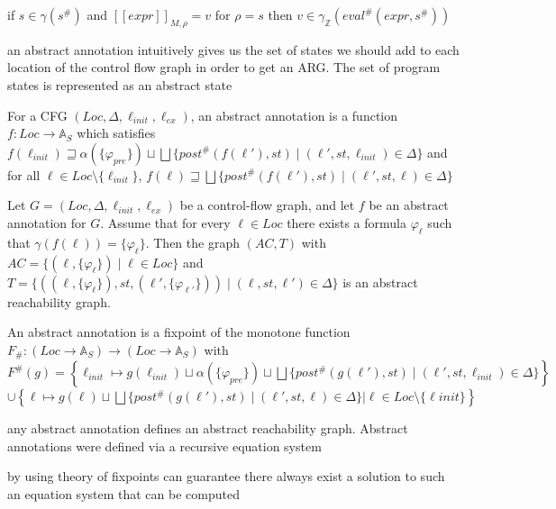 \documentclass[landscape, a4paper]{article}
\begin{document}
\begin{minipage}[t]{0.2\linewidth}
\begin{betterlist}
		\begin{betterlist}
			\item if $s \in \gamma(s^\#)$ and $[[expr]]_{M,\rho} = v$ for $\rho = s$ then $v \in \gamma_{\mathbb{Z}}(eval^\#(expr, s^\#))$
		\end{betterlist}\color{black}
		\item an abstract annotation intuitively gives us the set of states we should add to each location of the control flow graph in order to get an ARG. The set of program states is represented as an abstract state
		\item \color{orange}For a CFG $(Loc, \Delta, \ell_{init}, \ell_{ex})$, an \alert{abstract annotation} is a function $f: Loc \rightarrow \mathbb{A}_S$ which satisfies $f(\ell_{init}) \sqsupseteq \alpha(\{\varphi_{pre}\}) \sqcup \bigsqcup \{post^\#(f(\ell'), st) \mid (\ell′, st, \ell_{init}) \in \Delta\}$ and for all $\ell \in Loc \setminus \{\ell_{init}\}$, $f(\ell) \sqsupseteq \bigsqcup \{post^\#(f(\ell'), st) \mid (\ell', st, \ell) \in \Delta\}$\color{black}
		\begin{betterlist}
			\item Let $G = (Loc, \Delta, \ell_{init}, \ell_{ex})$ be a control-flow graph, and let $f$ be an abstract annotation for $G$. Assume that for every $\ell\in Loc$ there exists a formula $\varphi_{\ell}$ such that $\gamma(f(\ell)) = \{\varphi_{\ell}\}$. Then the graph $(AC, T)$ with $AC = \{(\ell, \{\varphi_{\ell}\}) \mid \ell \in Loc\}$ and $T = \{((\ell, \{\varphi_{\ell}\}), st, (\ell', \{\varphi_{\ell'}\})) \mid (\ell, st, \ell') \in \Delta\}$ is an \alert{abstract reachability graph}. 
			\item \color{orange}An abstract annotation is a fixpoint of the monotone function $F_\#  : (Loc \rightarrow \mathbb{A}_S) \rightarrow (Loc \rightarrow \mathbb{A}_S)$ with\\$F^\# (g) = \left\{\ell_{init} \mapsto g(\ell_{init}) \sqcup \alpha(\{\varphi_{pre}\}) \sqcup \bigsqcup \{post^\#(g(\ell'), st) \mid (\ell', st, \ell_{init}) \in \Delta \}\right\}$\\$\cup  \left\{\ell \mapsto g(\ell) \sqcup  \bigsqcup \{post^\#(g(\ell'), st) \mid (\ell', st, \ell) \in \Delta \} | \ell \in Loc \setminus \{ \ell init\}\right\}$\color{black}
			\item any abstract annotation defines an abstract reachability graph. Abstract annotations were defined via a recursive equation system
			\item by using theory of fixpoints can guarantee there always exist a solution to such an equation system that can be computed

\end{betterlist}
\end{betterlist}
\end{minipage}
\end{document}
